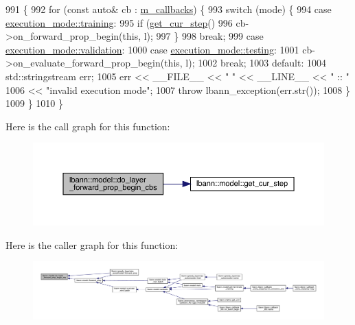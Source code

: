\begin{DoxyCode}
991                                                                          \{
992   \textcolor{keywordflow}{for} (\textcolor{keyword}{const} \textcolor{keyword}{auto}& cb : \hyperlink{classlbann_1_1model_a07b511fef30368494c2ad80922ffd0eb}{m\_callbacks}) \{
993     \textcolor{keywordflow}{switch} (mode) \{
994     \textcolor{keywordflow}{case} \hyperlink{base_8hpp_a2781a159088df64ed7d47cc91c4dc0a8ac185ddac8b5a8f5aa23c5b80bc12d214}{execution\_mode::training}:
995       \textcolor{keywordflow}{if} (\hyperlink{classlbann_1_1model_ad0cdcba177434b52dc9c4a97be183a92}{get\_cur\_step}() %
996         cb->on\_forward\_prop\_begin(\textcolor{keyword}{this}, l);
997       \}
998       \textcolor{keywordflow}{break};
999     \textcolor{keywordflow}{case} \hyperlink{base_8hpp_a2781a159088df64ed7d47cc91c4dc0a8aa617908b172c473cb8e8cda059e55bf0}{execution\_mode::validation}:
1000     \textcolor{keywordflow}{case} \hyperlink{base_8hpp_a2781a159088df64ed7d47cc91c4dc0a8aae2b1fca515949e5d54fb22b8ed95575}{execution\_mode::testing}:
1001       cb->on\_evaluate\_forward\_prop\_begin(\textcolor{keyword}{this}, l);
1002       \textcolor{keywordflow}{break};
1003     \textcolor{keywordflow}{default}:
1004       std::stringstream err;
1005       err << \_\_FILE\_\_ << \textcolor{stringliteral}{" "} << \_\_LINE\_\_ << \textcolor{stringliteral}{" :: "}
1006           << \textcolor{stringliteral}{"invalid execution mode"};
1007       \textcolor{keywordflow}{throw} lbann\_exception(err.str());
1008     \}
1009   \}
1010 \}
\end{DoxyCode}
Here is the call graph for this function\+:\nopagebreak
\begin{figure}[H]
\begin{center}
\leavevmode
\includegraphics[width=350pt]{classlbann_1_1model_ac19ce0dd060f9caddd6e14974a6e7713_cgraph}
\end{center}
\end{figure}
Here is the caller graph for this function\+:\nopagebreak
\begin{figure}[H]
\begin{center}
\leavevmode
\includegraphics[width=350pt]{classlbann_1_1model_ac19ce0dd060f9caddd6e14974a6e7713_icgraph}
\end{center}
\end{figure}
